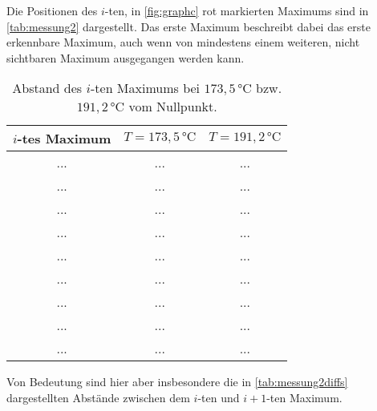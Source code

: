 Die Positionen des $i$-ten, in \autoref{fig:graphc} rot markierten Maximums sind in \autoref{tab:messung2} dargestellt.
Das erste Maximum beschreibt dabei das erste erkennbare Maximum, auch wenn von mindestens einem weiteren, nicht sichtbaren Maximum ausgegangen werden kann.

\begin{table}[H]
    \centering
    \caption{Abstand des $i$-ten Maximums bei $173,5 \,\unit{\celsius}$ bzw. $191,2 \,\unit{\celsius}$ vom Nullpunkt.}
    \label{tab:messung2}
    \begin{tabular}{S[table-format = 1.1] S[table-format = 2.3] S[table-format = 2.3]}
      \toprule
      {$i$-tes Maximum} & {$T = 173,5 \,\unit{\celsius}$} & {$T = 191,2 \,\unit{\celsius}$}\\
      \midrule
        {...}               &           {...}           &           {...}           \\
        {...}               &           {...}           &           {...}           \\
        {...}               &           {...}           &           {...}           \\
        {...}               &           {...}           &           {...}           \\
        {...}               &           {...}           &           {...}           \\
        {...}               &           {...}           &           {...}           \\
        {...}               &           {...}           &           {...}           \\
        {...}               &           {...}           &           {...}           \\
        {...}               &           {...}           &           {...}           \\
      \bottomrule
    \end{tabular}
\end{table}

Von Bedeutung sind hier aber insbesondere die in \autoref{tab:messung2diffs} dargestellten Abstände zwischen dem $i$-ten und $i + 1$-ten Maximum.

